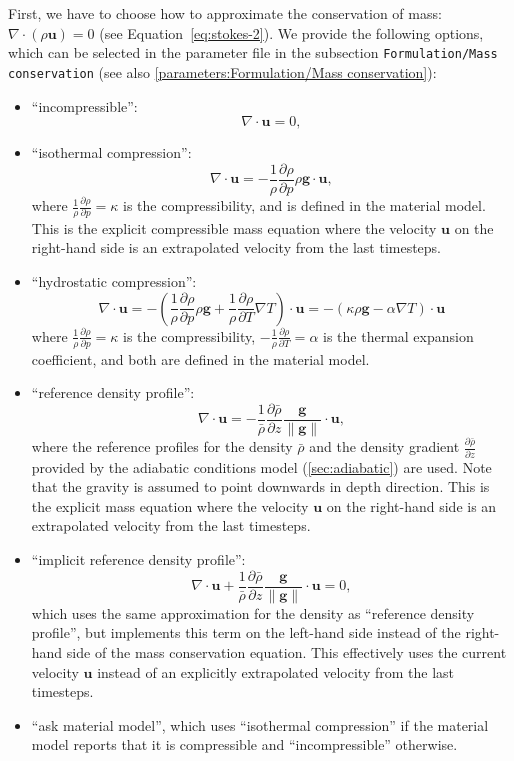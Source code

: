 \documentclass{article}
\begin{document}
First, we have to choose how to approximate the conservation of mass: $\nabla \cdot (\rho \mathbf u) = 0$ (see Equation~\eqref{eq:stokes-2}). 
We provide the following options, which can be selected in the parameter file in the subsection 
\texttt{Formulation/Mass conservation} (see also \ref{parameters:Formulation/Mass conservation}):

\begin{itemize}

\item
``incompressible'':
\[
 \nabla \cdot \textbf{u} = 0,
\]

\item
``isothermal compression'':
\[
 \nabla \cdot \textbf{u} = -\frac{1}{\rho} \frac{\partial \rho}{\partial p} \rho \textbf{g} \cdot \textbf{u},
\]
where $\frac{1}{\rho} \frac{\partial \rho}{\partial p} = \kappa$ is the compressibility, and 
is defined in the material model. This is the explicit compressible mass equation where 
the velocity $\textbf{u}$ on the right-hand side is an extrapolated velocity from the last timesteps.

\item
``hydrostatic compression'':
\[
 \nabla \cdot \textbf{u}
= - \left( \frac{1}{\rho} \frac{\partial \rho}{\partial p} \rho \textbf{g} + \frac{1}{\rho} \frac{\partial \rho}{\partial T} \nabla T \right) \cdot \textbf{u}
= - \left( \kappa \rho \textbf{g} - \alpha \nabla T \right) \cdot \textbf{u}
\]
where $\frac{1}{\rho} \frac{\partial \rho}{\partial p} = \kappa$ is the compressibility,
$- \frac{1}{\rho}\frac{\partial \rho}{\partial T} = \alpha$ is the thermal expansion coefficient, 
and both are defined in the material model. 

\item
``reference density profile'':
\[
 \nabla \cdot \textbf{u} = -\frac{1}{\bar{\rho}} \frac{\partial \bar{\rho}}{\partial z} \frac{\textbf{g}}{\|\textbf{g}\|} \cdot \textbf{u},
\]
where the reference profiles for the density $\bar{\rho}$ and the density gradient $\frac{\partial \bar{\rho}}{\partial z}$
provided by the adiabatic conditions model (\ref{sec:adiabatic})
are used. Note that the gravity is assumed to point downwards in depth direction.
This is the explicit mass equation where the velocity $\textbf{u}$ on the right-hand 
side is an extrapolated velocity from the last timesteps.

\item
``implicit reference density profile'':
\[
 \nabla \cdot \textbf{u} + \frac{1}{\bar{\rho}} \frac{\partial \bar{\rho}}{\partial z} \frac{\textbf{g}}{\|\textbf{g}\|} \cdot \textbf{u} = 0,
\]
which uses the same approximation for the density as ``reference density profile'', 
but implements this term on the left-hand side instead of the right-hand side of the mass
conservation equation. This effectively uses the current velocity $\textbf{u}$ instead
of an explicitly extrapolated velocity from the last timesteps.

 \item 
``ask material model'', which uses ``isothermal compression'' if the material model reports 
that it is compressible and ``incompressible'' otherwise.
\end{itemize}
\end{document}
